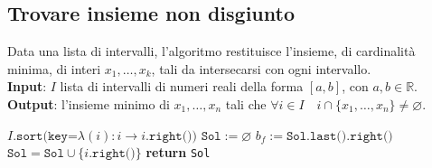 \documentclass[a4paper, 12pt]{report}
\begin{document}
    \subsection{Trovare insieme non disgiunto}

    \begin{algorithm}[H]
        \caption{
            Data una lista di intervalli, l'algoritmo restituisce l'insieme, di cardinalità minima, di interi $x_1, \ldots, x_k$, tali da intersecarsi con ogni intervallo.\\
            \textbf{Input}: $I$ lista di intervalli di numeri reali della forma $[a, b]$, con $a, b \in \mathbb{R}$.\\
            \textbf{Output}: l'insieme minimo di $x_1, \ldots, x_n$ tali che $\forall i \in I \quad i \cap \{x_1, \ldots, x_n\} \neq \varnothing$.
        }

        \begin{algorithmic}[1]
                \State $I\texttt{.sort(key=}\lambda (i) : i \rightarrow i\texttt{.right())}$ 
                \State $\texttt{Sol}:= \varnothing$
                    \State $b_f := \texttt{Sol.last().right()}$ 
                     
                        \State $\texttt{Sol} = \texttt{Sol} \cup \{i\texttt{.right()}\}$
                    \EndIf
                \EndFor
                \State \textbf{return} \texttt{Sol}
            \EndFunction
        \end{algorithmic}
    \end{algorithm}
\end{document}
